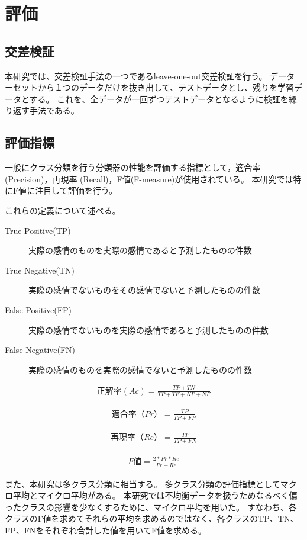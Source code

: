 \section{評価}
\subsection{交差検証}
本研究では、交差検証手法の一つであるleave-one-out交差検証を行う。
データーセットから１つのデータだけを抜き出して、テストデータとし、残りを学習データとする。
これを、全データが一回ずつテストデータとなるように検証を繰り返す手法である。

\subsection{評価指標}
一般にクラス分類を行う分類器の性能を評価する指標として，適合率 (Precision)，再現率 (Recall)，F値(F-measure)が使用されている。
本研究では特にF値に注目して評価を行う。

これらの定義について述べる。

\begin{description}
   \item[True Positive(TP)] 実際の感情のものを実際の感情であると予測したものの件数
   \item[True Negative(TN)] 実際の感情でないものをその感情でないと予測したものの件数
   \item[False Positive(FP)] 実際の感情でないものを実際の感情であると予測したものの件数
   \item[False Negative(FN)] 実際の感情のものを実際の感情でないと予測したものの件数
 \end{description}

\begin{eqnarray}
  正解率(Ac) =  \frac{TP + TN} {TP + TF + NP + NF}
\end{eqnarray}

\begin{eqnarray}
  適合率（Pr） = \frac{TP} {TP + FP}
\end{eqnarray}

\begin{eqnarray}
  再現率（Re） =  \frac{TP} {TP + FN}
\end{eqnarray}

\begin{eqnarray}
  F値 =  \frac{2*Pr*Re}{Pr + Re}
\end{eqnarray}

また、本研究は多クラス分類に相当する。
多クラス分類の評価指標としてマクロ平均とマイクロ平均がある。
本研究では不均衡データを扱うためなるべく偏ったクラスの影響を少なくするために、マイクロ平均を用いた。
すなわち、各クラスのF値を求めてそれらの平均を求めるのではなく、各クラスのTP、TN、FP、FNをそれぞれ合計した値を用いてF値を求める。


